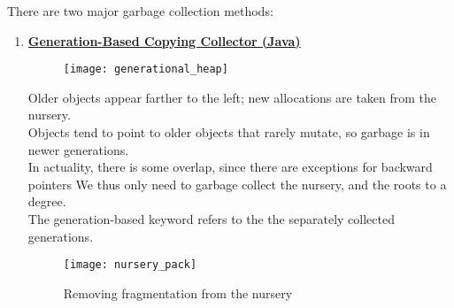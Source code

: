 \documentclass[../../lecture_notes.tex]{subfiles}
\begin{document}
\noindent There are two major garbage collection methods:
	\begin{enumerate} [itemsep=0mm]
	\item \textbf{\underline{Generation-Based Copying Collector (Java)}}

		\begin{figure}[H]
			\centering
			\texttt{[image: generational\_heap]}
			\label{fig:test}
		\end{figure}

		Older objects appear farther to the left; new allocations are taken from the nursery.\\
		Objects tend to point to older objects that rarely mutate, so garbage is in newer generations.\\
		In actuality, there is some overlap, since there are exceptions for backward pointers
		We thus only need to garbage collect the nursery, and the roots to a degree.\\
		The generation-based keyword refers to the the separately collected generations.\\

		\begin{figure}[H]
			\centering
			\texttt{[image: nursery\_pack]}
			\caption{Removing fragmentation from the nursery}
			\label{fig:test}
		\end{figure}


\end{enumerate}
\end{document}
